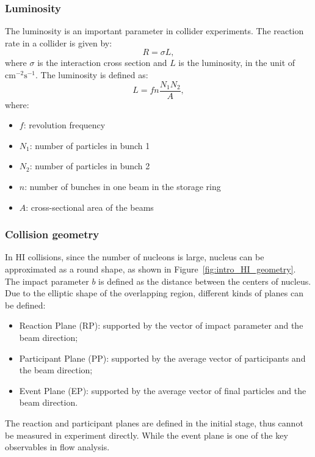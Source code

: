 \subsubsection{Luminosity}

The luminosity is an important parameter in collider experiments. The reaction rate in a collider is given by:
\begin{equation}
R = \sigma L,
\end{equation}
where $\sigma$ is the interaction cross section and $L$ is the luminosity, in the unit of $\text{cm}^{-2}\text{s}^{-1}$. The luminosity is defined as:
\begin{equation}
L = f n \frac{N_1 N_2}{A},
\end{equation}
where:
\begin{itemize}
\item $f$: revolution frequency
\item $N_1$: number of particles in bunch 1
\item $N_2$: number of particles in bunch 2
\item $n$: number of bunches in one beam in the storage ring
\item $A$: cross-sectional area of the beams
\end{itemize}



\subsubsection{Collision geometry}

In HI collisions, since the number of nucleons is large, nucleus can be approximated as a round shape, as shown in Figure~\ref{fig:intro_HI_geometry}. The impact parameter $b$ is defined as the distance between the centers of nucleus. Due to the elliptic shape of the overlapping region, different kinds of planes can be defined:
\begin{itemize}
\item Reaction Plane (RP): supported by the vector of impact parameter and the beam direction;
\item Participant Plane (PP): supported by the average vector of participants and the beam direction;
\item Event Plane (EP): supported by the average vector of final particles and the beam direction.
\end{itemize}
The reaction and participant planes are defined in the initial stage, thus cannot be measured in experiment directly. While the event plane is one of the key observables in flow analysis.


